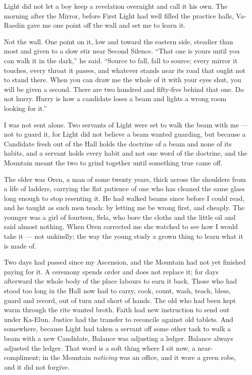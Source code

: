 

\noindent Light did not let a boy keep a revelation overnight and call it his own. The morning after the Mirror, before First Light had well filled the practice halls, Va-Raedin gave me one point off the wall and set me to learn it.\par

Not the wall. One point on it, low and toward the eastern side, steadier than most and given to a slow stir near Second Silence. ``That one is yours until you can walk it in the dark,'' he said. ``Source to fall, fall to source; every mirror it touches, every throat it passes, and whatever stands near its road that ought not to stand there. When you can draw me the whole of it with your eyes shut, you will be given a second. There are two hundred and fifty-five behind that one. Do not hurry. Hurry is how a candidate loses a beam and lights a wrong room looking for it.''\par

I was not sent alone. Two servants of Light were set to walk the beam with me --- not to guard it, for Light did not believe a beam wanted guarding, but because a Candidate fresh out of the Hall holds the doctrine of a beam and none of its habits, and a servant holds every habit and not one word of the doctrine, and the Mountain meant the two to grind together until something true came off.\par

The elder was Oren, a man of some twenty years, thick across the shoulders from a life of ladders, carrying the flat patience of one who has cleaned the same glass long enough to stop resenting it. He had walked beams since before I could read, and he taught as such men teach: by letting me be wrong first, and cheaply. The younger was a girl of fourteen, Sela, who bore the cloths and the little oil and said almost nothing. When Oren corrected me she watched to see how I would take it --- not unkindly; the way the young study a grown thing to learn what it is made of.\par

Two days had passed since my Ascension, and the Mountain had not yet finished paying for it. A ceremony spends order and does not replace it; for days afterward the whole body of the place labours to earn it back. Those who had stood too long in the Hall now had to carry, cook, count, wash, teach, bless, guard and record, out of turn and short of hands. The old who had been kept warm through the rite wanted broth. Faith had new instruction to send out under Ka-Elun. Justice had the transfer to reconcile against old tablets. And somewhere, because Light had taken a servant off some other task to walk a beam with a new Candidate, Balance was adjusting a ledger. Balance always adjusted the ledger. That word is a soft thing where I sit now, a near-compliment; in the Mountain \textit{noticing} was an office, and it wore a green robe, and it did not forgive.\par
 
